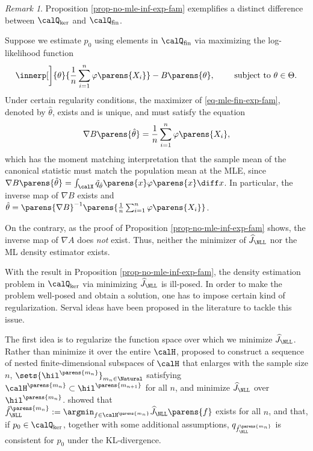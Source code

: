 \documentclass[12pt]{article}
\theoremstyle{definition}
\theoremstyle{theorem}
\theoremstyle{remark}
\newtheorem{remark}{Remark}
\begin{document}
\begin{remark}
	Proposition \ref{prop-no-mle-inf-exp-fam} exemplifies a distinct difference between $\calQ_{\ker}$ and $\calQ_{\mathrm{fin}}$. 
	
	Suppose we estimate $p_0$ using elements in $\calQ_{\mathrm{fin}}$ via maximizing the log-likelihood function
	\begin{align}\label{eq-mle-fin-exp-fam}
		\innerp[\bigg]{\theta}{\frac{1}{n} \sum_{i=1}^n \varphi \parens{X_i}} - B \parens{\theta}, \qquad \text{ subject to } \theta \in \Theta. 
	\end{align}
	Under certain regularity conditions, the maximizer of \eqref{eq-mle-fin-exp-fam}, denoted by $\hat{\theta}$, exists and is unique, and must satisfy the equation 
	\begin{align}\label{eq-moment-matching-fin-exp-fam}
		\nabla B \parens{\hat{\theta}} = \frac{1}{n} \sum_{i=1}^n \varphi \parens{X_i}, 
	\end{align}
	which has the moment matching interpretation that the sample mean of the canonical statistic must match the population mean at the MLE, since $\nabla B \parens{\hat{\theta}} = \int_{\calX} \tilde{q}_{\hat{\theta}} \parens{x} \varphi \parens{x} \diff x$. In particular, the inverse map of $\nabla B$ exists and $\hat{\theta} = \parens{\nabla B}^{-1} \parens{\frac{1}{n} \sum_{i=1}^n \varphi \parens{X_i}}$. 
	
	On the contrary, as the proof of Proposition \ref{prop-no-mle-inf-exp-fam} shows, the inverse map of $\nabla A$ does \emph{not} exist. Thus, neither the minimizer of $\widehat{J}_{\NLL}$ nor the ML density estimator exists. 
\end{remark}

With the result in Proposition \ref{prop-no-mle-inf-exp-fam}, the density estimation problem in $\calQ_{\ker}$ via minimizing $\widehat{J}_{\NLL}$ is ill-posed. In order to make the problem well-posed and obtain a solution, one has to impose certain kind of regularization. Serval ideas have been proposed in the literature to tackle this issue. 

The first idea is to regularize the function space over which we minimize $\widehat{J}_{\NLL}$. Rather than minimize it over the entire $\calH$, \textcite{Fukumizu2005-mf} proposed to construct a sequence of nested finite-dimensional subspaces of $\calH$ that enlarges with the sample size $n$, $\sets{\hil^{\parens{m_n}}}_{m_n \in \Natural}$ satisfying $\calH^{\parens{m_n}} \subset \hil^{\parens{m_{n+1}}}$ for all $n$, and minimize $\widehat{J}_{\NLL}$ over $\hil^{\parens{m_n}}$. \textcite{Fukumizu2005-mf} showed that $\hat{f}_{\NLL}^{\parens{m_n}} := \argmin_{f \in \calH^{\parens{m_n}}} \widehat{J}_{\NLL} \parens{f}$ exists for all $n$, and that, if $p_0 \in \calQ_{\ker}$, together with some additional assumptions, $q_{\hat{f}_{\NLL}^{\parens{m_n}}}$ is consistent for $p_0$ under the KL-divergence. 
\end{document}
